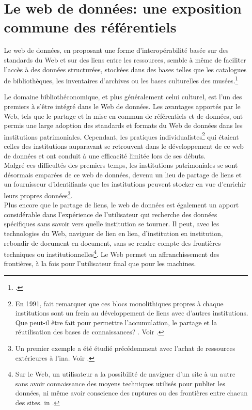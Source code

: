 \chapter{\label{II-A}Le web de données: une exposition commune des référentiels}

\begin{citationLongue}
	Le web de données, en proposant une forme d'interopérabilité basée sur des standards du Web et sur des liens entre les ressources, semble à même de faciliter l'accès à des données structurées, stockées dans des bases telles que les catalogues de bibliothèques, les inventaires d'archives ou les bases culturelles des musées.\footcite[p.45]{dalbin_approches_2011}
\end{citationLongue}
\medskip
Le domaine bibliothéconomique, et plus généralement celui culturel, est l'un des premiers à s'être intégré dans le Web de données. Les avantages apportés par le Web, tels que le partage et la mise en commun de référentiels et de données, ont permis une large adoption des standards et formats du Web de données dans les institutions patrimoniales. Cependant, les pratiques individualistes\footnote{En 1991,  fait remarquer que ces \og blocs monolithiques\fg{} propres à chaque institutions sont un frein au développement de liens avec d'autres institutions. \og Que peut-il être fait pour permettre l'accumulation, le partage et la réutilisation des bases de connaissances? \fg{}. Voir \cite[p.1]{gruber_role_1991}.} qui étaient celles des institutions auparavant se retrouvent dans le développement de ce web de données et ont conduit à une efficacité limitée lors de ses débuts.\\

Malgré ces difficultés des premiers temps, les institutions patrimoniales se sont désormais emparées de ce web de données, devenu un lieu de partage de liens et un fournisseur d'identifiants que les institutions peuvent stocker en vue d'enrichir leurs propres données\footnote{Un premier exemple a été étudié précédemment avec l'achat de ressources extérieures à l'\ac{ina}. Voir .}.\\

Plus encore que le partage de liens, le web de données est également un apport considérable dans l'expérience de l'utilisateur qui recherche des données spécifiques sans savoir vers quelle institution se tourner. Il peut, avec les technologies du Web, naviguer de lien en lien, d'institution en institution, rebondir de document en document, sans se rendre compte des frontières techniques ou institutionnelles\footnote{\og Sur le Web, un utilisateur a la possibilité de naviguer d'un site à un autre sans avoir connaissance des moyens techniques utilisés pour publier les données, ni même avoir conscience des ruptures ou des frontières entre chacun des sites. \fg{} in \cite[p.45]{dalbin_approches_2011}.}. Le Web permet un affranchissement des frontières, à la fois pour l'utilisateur final que pour les machines.\\

